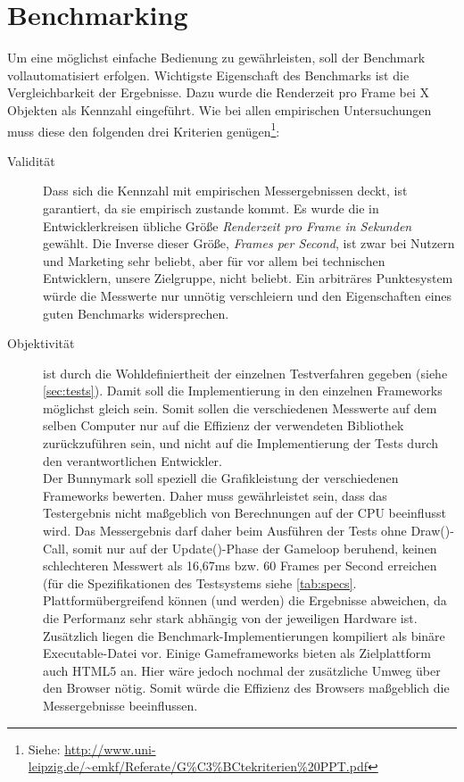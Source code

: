 \section{Benchmarking}
Um eine möglichst einfache Bedienung zu gewährleisten, soll der Benchmark vollautomatisiert erfolgen. Wichtigste Eigenschaft des Benchmarks ist die Vergleichbarkeit der Ergebnisse. Dazu wurde die Renderzeit pro Frame bei X Objekten als Kennzahl eingeführt. Wie bei allen empirischen Untersuchungen muss diese den folgenden drei Kriterien genügen\footnote{Siehe: \url{http://www.uni-leipzig.de/~emkf/Referate/G\%C3\%BCtekriterien\%20PPT.pdf}}:\\
\begin{description}
\item[Validität] Dass sich die Kennzahl mit empirischen Messergebnissen deckt, ist garantiert, da sie empirisch zustande kommt. Es wurde die in Entwicklerkreisen übliche Größe {\em Renderzeit pro Frame in Sekunden} gewählt. Die Inverse dieser Größe, {\em Frames per Second}, ist zwar bei Nutzern und Marketing sehr beliebt, aber für vor allem bei technischen Entwicklern, unsere Zielgruppe, nicht beliebt. Ein arbiträres Punktesystem würde die Messwerte nur unnötig verschleiern und den Eigenschaften eines guten Benchmarks widersprechen.\\

\item[Objektivität] ist durch die Wohldefiniertheit der einzelnen Testverfahren gegeben (siehe \ref{sec:tests}). Damit soll die Implementierung in den einzelnen Frameworks möglichst gleich sein. Somit sollen die verschiedenen Messwerte auf dem selben Computer nur auf die Effizienz der verwendeten Bibliothek zurückzuführen sein, und nicht auf die Implementierung der Tests durch den verantwortlichen Entwickler.\\
Der Bunnymark soll speziell die Grafikleistung der verschiedenen Frameworks bewerten. Daher muss gewährleistet sein, dass das Testergebnis nicht maßgeblich von Berechnungen auf der CPU beeinflusst wird. Das Messergebnis darf daher beim Ausführen der Tests ohne Draw()-Call, somit nur auf der Update()-Phase der Gameloop beruhend, keinen schlechteren Messwert als 16,67ms bzw. 60 Frames per Second erreichen (für die Spezifikationen des Testsystems siehe \ref{tab:specs}. Plattformübergreifend können (und werden) die Ergebnisse abweichen, da die Performanz sehr stark abhängig von der jeweiligen Hardware ist.\\
Zusätzlich liegen die Benchmark-Implementierungen kompiliert als binäre Executable-Datei vor. Einige Gameframeworks bieten als Zielplattform auch HTML5 an. Hier wäre jedoch nochmal der zusätzliche Umweg über den Browser nötig. Somit würde die Effizienz des Browsers maßgeblich die Messergebnisse beeinflussen.\\


\end{description}
